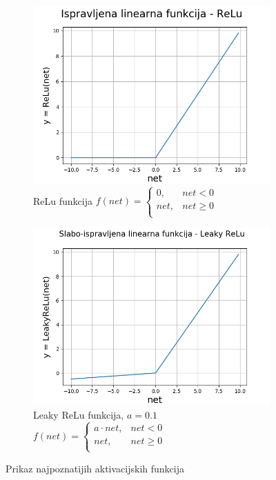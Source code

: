 \documentclass[times, utf8, diplomski]{fer}
\theoremstyle{definition}
\begin{document}
\begin{figure}
\begin{subfigure}[t]{.5\textwidth}
\centering
\includegraphics[width=\linewidth]{relu_funkcija.png}
\caption{ReLu funkcija
\centering
$
f(net) = \begin{cases}
0, & net < 0\\
net, & net \geq 0\\
\end{cases}
$
}
\end{subfigure}
\hfill
\begin{subfigure}[t]{.5\textwidth}
\centering
\includegraphics[width=\linewidth]{lrelu_funkcija.png}
\caption{Leaky ReLu funkcija, $a=0.1$
\centering
$
f(net) = \begin{cases}
a \cdot net, & net < 0\\
net, & net \geq 0\\
\end{cases}
$
}
\end{subfigure}
\caption{Prikaz najpoznatijih aktivacijskih funkcija}
\end{figure}
\end{document}
